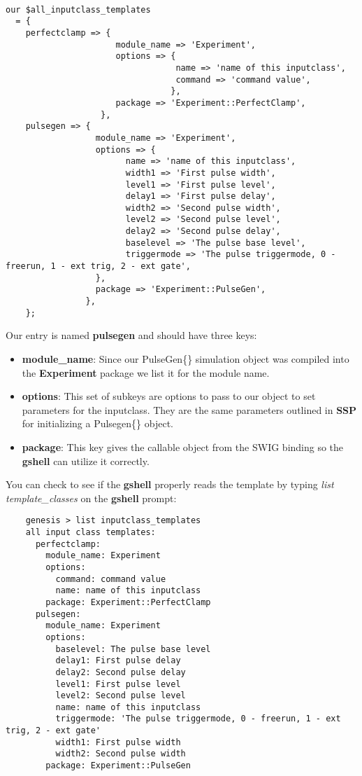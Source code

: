 \documentclass[12pt]{article}
\begin{document}
\begin{verbatim}

our $all_inputclass_templates 
  = {
    perfectclamp => {
                      module_name => 'Experiment',
                      options => {
                                  name => 'name of this inputclass',
                                  command => 'command value',
                                 },
                      package => 'Experiment::PerfectClamp',
			       },
    pulsegen => {
                  module_name => 'Experiment',
				  options => {
					    name => 'name of this inputclass',
					    width1 => 'First pulse width',
					    level1 => 'First pulse level',
					    delay1 => 'First pulse delay',
					    width2 => 'Second pulse width',
					    level2 => 'Second pulse level',
					    delay2 => 'Second pulse delay',
					    baselevel => 'The pulse base level',
					    triggermode => 'The pulse triggermode, 0 - freerun, 1 - ext trig, 2 - ext gate',
				  },
                  package => 'Experiment::PulseGen',
                },
    };
\end{verbatim}

Our entry is named {\bf pulsegen} and should have three keys:

\begin{itemize}
\item[] {\bf module\_name}: Since our PulseGen\{\} simulation object was compiled into the {\bf Experiment} package we list it for the module name.
\item[] {\bf options}: This set of subkeys are options to pass to our object to set parameters for the inputclass. They are the same parameters outlined in {\bf SSP} for initializing a Pulsegen\{\} object.
\item[] {\bf package}: This key gives the callable object from the SWIG binding so the {\bf gshell} can utilize it correctly.
\end{itemize}

You can check to see if the {\bf gshell} properly reads the template by typing {\it list template\_classes} on the {\bf gshell} prompt:

\begin{verbatim}
	genesis > list inputclass_templates                                                          
	all input class templates:
	  perfectclamp:
	    module_name: Experiment
	    options:
	      command: command value
	      name: name of this inputclass
	    package: Experiment::PerfectClamp
	  pulsegen:
	    module_name: Experiment
	    options:
	      baselevel: The pulse base level
	      delay1: First pulse delay
	      delay2: Second pulse delay
	      level1: First pulse level
	      level2: Second pulse level
	      name: name of this inputclass
	      triggermode: 'The pulse triggermode, 0 - freerun, 1 - ext trig, 2 - ext gate'
	      width1: First pulse width
	      width2: Second pulse width
	    package: Experiment::PulseGen

\end{verbatim}
\end{document}
